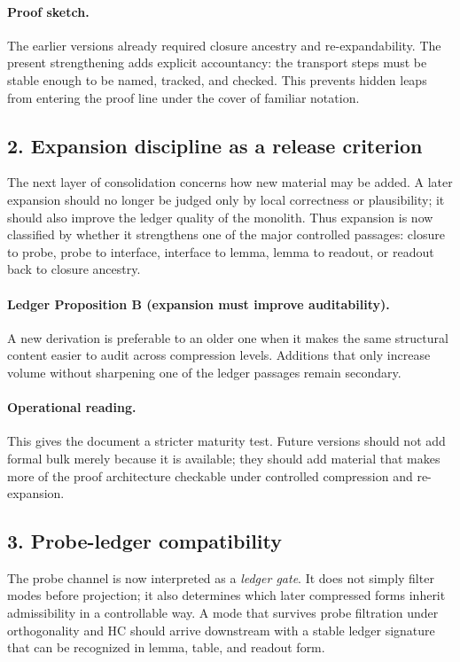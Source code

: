 \paragraph{Proof sketch.}
The earlier versions already required closure ancestry and re-expandability. The
present strengthening adds explicit accountancy: the transport steps must be
stable enough to be named, tracked, and checked. This prevents hidden leaps from
entering the proof line under the cover of familiar notation.

\subsection*{2. Expansion discipline as a release criterion}
The next layer of consolidation concerns how new material may be added. A later
expansion should no longer be judged only by local correctness or plausibility;
it should also improve the ledger quality of the monolith. Thus expansion is now
classified by whether it strengthens one of the major controlled passages:
closure to probe, probe to interface, interface to lemma, lemma to readout, or
readout back to closure ancestry.

\paragraph{Ledger Proposition B (expansion must improve auditability).}
A new derivation is preferable to an older one when it makes the same structural
content easier to audit across compression levels. Additions that only increase
volume without sharpening one of the ledger passages remain secondary.

\paragraph{Operational reading.}
This gives the document a stricter maturity test. Future versions should not add
formal bulk merely because it is available; they should add material that makes
more of the proof architecture checkable under controlled compression and
re-expansion.

\subsection*{3. Probe-ledger compatibility}
The probe channel is now interpreted as a \emph{ledger gate}. It does not simply
filter modes before projection; it also determines which later compressed forms
inherit admissibility in a controllable way. A mode that survives probe
filtration under orthogonality and HC should arrive downstream with a stable
ledger signature that can be recognized in lemma, table, and readout form.

